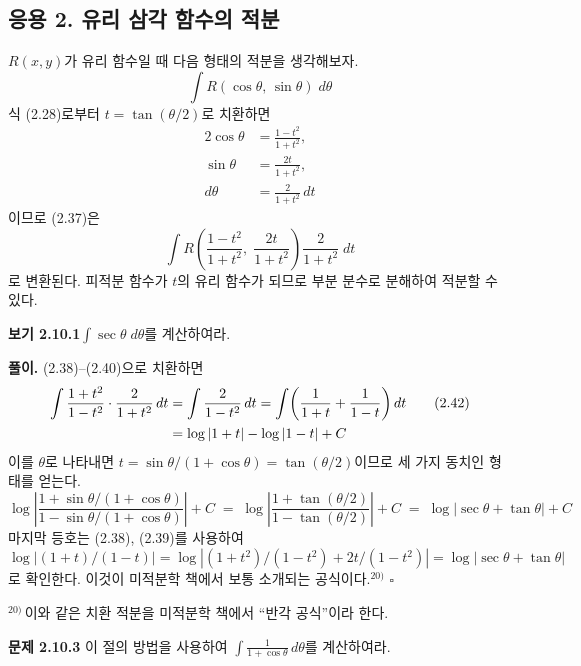 \documentclass{article}
\begin{document}
\subsection*{응용 2. 유리 삼각 함수의 적분}

$R(x,y)$가 유리 함수일 때 다음 형태의 적분을 생각해보자.
\begin{equation}
  \int R(\cos\theta,\,\sin\theta)\;d\theta \tag{2.37}
\end{equation}
식 (2.28)로부터 $t=\tan(\theta/2)$로 치환하면
\begin{alignat}{2}
  \cos\theta &= \frac{1-t^2}{1+t^2}, \tag{2.38}\\[2pt]
  \sin\theta &= \frac{2t}{1+t^2},    \tag{2.39}\\[2pt]
  d\theta    &= \frac{2}{1+t^2}\,dt  \tag{2.40}
\end{alignat}
이므로 (2.37)은
\begin{equation}
  \int R\!\left(\frac{1-t^2}{1+t^2},\;\frac{2t}{1+t^2}\right)\frac{2}{1+t^2}\;dt \tag{2.41}
\end{equation}
로 변환된다. 피적분 함수가 $t$의 유리 함수가 되므로 부분 분수로 분해하여 적분할 수 있다.

\bigskip
\textbf{보기 2.10.1}\quad $\displaystyle\int\sec\theta\;d\theta$를 계산하여라.

\medskip
\textbf{풀이.}\quad
(2.38)--(2.40)으로 치환하면
\begin{align}
  \int\frac{1+t^2}{1-t^2}\cdot\frac{2}{1+t^2}\,dt
  &= \int\frac{2}{1-t^2}\,dt
   = \int\!\left(\frac{1}{1+t}+\frac{1}{1-t}\right)dt \tag{2.42}\\
  &= \log|1+t| - \log|1-t| + C \notag
\end{align}
이를 $\theta$로 나타내면 $t = \sin\theta/(1+\cos\theta) = \tan(\theta/2)$이므로 세 가지 동치인 형태를 얻는다.
\[
  \log\!\left|\frac{1+\sin\theta/(1+\cos\theta)}{1-\sin\theta/(1+\cos\theta)}\right|+C
  \;=\;\log\!\left|\frac{1+\tan(\theta/2)}{1-\tan(\theta/2)}\right|+C
  \;=\;\log|\sec\theta+\tan\theta|+C
\]
마지막 등호는 (2.38), (2.39)를 사용하여
$\log|(1+t)/(1-t)| = \log|(1+t^2)/(1-t^2) + 2t/(1-t^2)| = \log|\sec\theta+\tan\theta|$로 확인한다.
이것이 미적분학 책에서 보통 소개되는 공식이다.$^{20)}$ \hfill $\square$

\smallskip
\noindent$^{20)}$\,\small 이와 같은 치환 적분을 미적분학 책에서 ``반각 공식''이라 한다.\normalsize

\bigskip
\textbf{문제 2.10.3}\quad
이 절의 방법을 사용하여 $\displaystyle\int\frac{1}{1+\cos\theta}\,d\theta$를 계산하여라.
\end{document}
